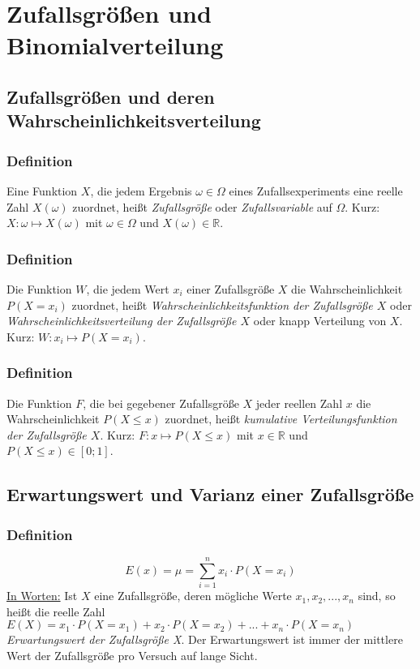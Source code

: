 \documentclass[a4paper,12pt]{article}
\newcommand{\R}{\mathbb{R}}
\begin{document}
\newpage
\section{Zufallsgrößen und Binomialverteilung}
\subsection{Zufallsgrößen und deren Wahrscheinlichkeitsverteilung}
\subsubsection{Definition}
Eine Funktion $X$, die jedem Ergebnis $\omega \in \Omega$ eines Zufallsexperiments eine reelle Zahl $X(\omega)$ zuordnet, heißt \emph{Zufallsgröße} oder \emph{Zufallsvariable} auf $\Omega$. Kurz: $X:\omega \mapsto X(\omega)$ mit $\omega \in \Omega$ und $X(\omega) \in \R$.

\subsubsection{Definition}
Die Funktion $W$, die jedem Wert $x_i$ einer Zufallsgröße $X$ die Wahrscheinlichkeit $P(X=x_i)$ zuordnet, heißt \emph{Wahrscheinlichkeitsfunktion der Zufallsgröße $X$} oder \emph{Wahrscheinlichkeitsverteilung der Zufallsgröße $X$} oder knapp Verteilung von $X$. Kurz: $W:x_i \mapsto P(X=x_i)$.

\subsubsection{Definition}
Die Funktion $F$, die bei gegebener Zufallsgröße $X$ jeder reellen Zahl $x$ die Wahrscheinlichkeit $P(X\leq x)$ zuordnet, heißt \emph{kumulative Verteilungsfunktion der Zufallsgröße $X$}. Kurz: $F:x\mapsto P(X\leq x)$ mit $x \in \R$ und $P(X\leq x) \in [0; 1]$.

\subsection{Erwartungswert und Varianz einer Zufallsgröße}
\subsubsection{Definition}
\[ E(x) = \mu = \sum\limits_{i=1}^{n} x_i \cdot P(X=x_i) \]
\underline{In Worten:} Ist $X$ eine Zufallsgröße, deren mögliche Werte $x_1, x_2, ..., x_n$ sind, so heißt die reelle Zahl $E(X)=x_1 \cdot P(X=x_1) + x_2 \cdot P(X=x_2) + ... + x_n\cdot P(X=x_n)$ \emph{Erwartungswert der Zufallsgröße X}. Der Erwartungswert ist immer der mittlere Wert der Zufallsgröße pro Versuch auf lange Sicht. 
\end{document}
